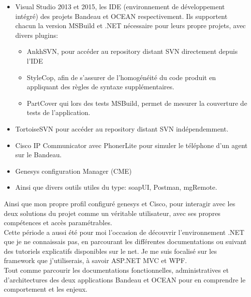 \documentclass{rapport}
\begin{document}
\begin{itemize}
  \item Visual Studio 2013 et 2015, les IDE (environnement de développement intégré) des projets Bandeau et OCEAN respectivement. Ils supportent chacun la version MSBuild et .NET nécessaire pour leurs propre projets, avec divers plugins:
  
    \begin{itemize}
        \item AnkhSVN, pour accéder au repository distant SVN directement depuis l'IDE
  
        \item StyleCop, afin de s'assurer de l'homogénéité du code produit en appliquant des règles de syntaxe supplémentaires.
  
        \item PartCover qui lors des tests MSBuild, permet de mesurer la couverture de tests de l'application.
    \end{itemize}

  \item TortoiseSVN pour accéder au repository distant SVN indépendemment.
  
  \item Cisco IP Communicator avec PhonerLite pour simuler le téléphone d'un agent sur le Bandeau.
  
  \item Genesys configuration Manager (CME)
  
  \item Ainsi que divers outils utiles du type: soapUI, Postman, mgRemote.
  
\end{itemize}

Ainsi que mon propre profil configuré genesys et Cisco, pour interagir avec les deux solutions du projet comme un véritable utilisateur, avec ses propres compétences et accès paramétrables.\\

Cette période a aussi été pour moi l'occasion de découvrir l'environnement .NET que je ne connaissais pas, en parcourant les différentes documentations ou suivant des tutoriels explicatifs disponibles sur le net. Je me suis focalisé sur les framework que j'utiliserais, à savoir ASP.NET MVC et WPF.\\
Tout comme parcourir les documentations fonctionnelles, administratives et d'architectures des deux applications Bandeau et OCEAN pour en comprendre le comportement et les enjeux.\\
\end{document}
